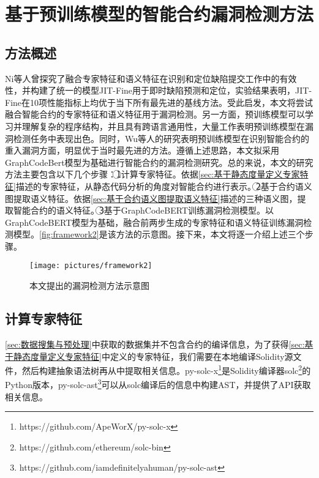 \chapter{基于预训练模型的智能合约漏洞检测方法}

\section{方法概述}
\label{sec:方法概述}
Ni等人\cite{bestofboth}曾探究了融合专家特征和语义特征在识别和定位缺陷提交工作中的有效性，并构建了统一的模型JIT-Fine用于即时缺陷预测和定位，实验结果表明，JIT-Fine在10项性能指标上均优于当下所有最先进的基线方法。受此启发，本文将尝试融合智能合约的专家特征和语义特征用于漏洞检测。另一方面，预训练模型可以学习并理解复杂的程序结构，并且具有跨语言通用性，大量工作表明预训练模型在漏洞检测任务中表现出色\cite{pretrained_is_good_1,pretrained_is_good_2,pretrained_is_good_3}。同时，Wu等人的研究表明预训练模型在识别智能合约的重入漏洞方面，明显优于当时最先进的方法\cite{wu2021peculiar}。遵循上述思路，本文拟采用GraphCodeBert模型为基础进行智能合约的漏洞检测研究。总的来说，本文的研究方法主要包含以下几个步骤：\textcircled{1}计算专家特征。依据\autoref{sec:基于静态度量定义专家特征}描述的专家特征，从静态代码分析的角度对智能合约进行表示。\textcircled{2}基于合约语义图提取语义特征。依据\autoref{sec:基于合约语义图提取语义特征}描述的三种语义图，提取智能合约的语义特征。\textcircled{3}基于GraphCodeBERT训练漏洞检测模型。以GraphCodeBERT模型为基础，融合前两步生成的专家特征和语义特征训练漏洞检测模型。\autoref{fig:framework2}是该方法的示意图。接下来，本文将逐一介绍上述三个步骤。
\begin{figure}[htbp]
    \centering
    \texttt{[image: pictures/framework2]}
    \caption{\label{fig:framework2}本文提出的漏洞检测方法示意图}
\end{figure}

\section{计算专家特征}
\label{sec:计算专家特征}
\autoref{sec:数据搜集与预处理}中获取的数据集并不包含合约的编译信息，为了获得\autoref{sec:基于静态度量定义专家特征}中定义的专家特征，我们需要在本地编译Solidity源文件，然后构建抽象语法树再从中提取相关信息。py-solc-x\footnote{https://github.com/ApeWorX/py-solc-x}是Solidity编译器solc\footnote{https://github.com/ethereum/solc-bin}的Python版本，py-solc-ast\footnote{https://github.com/iamdefinitelyahuman/py-solc-ast}可以从solc编译后的信息中构建AST，并提供了API获取相关信息。

